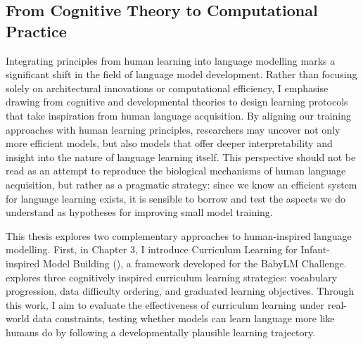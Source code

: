 

\subsection*{From Cognitive Theory to Computational Practice}

Integrating principles from human learning into language modelling marks a significant shift in the field of language model development. Rather than focusing solely on architectural innovations or computational efficiency, I emphasise drawing from cognitive and developmental theories to design learning protocols that take inspiration from human language acquisition. By aligning our training approaches with human learning principles, researchers may uncover not only more efficient models, but also models that offer deeper interpretability and insight into the nature of language learning itself. This perspective should not be read as an attempt to reproduce the biological mechanisms of human language acquisition, but rather as a pragmatic strategy: since we know an efficient system for language learning exists, it is sensible to borrow and test the aspects we do understand as hypotheses for improving small model training.

This thesis explores two complementary approaches to human-inspired language modelling. First, in Chapter 3, I introduce Curriculum Learning for Infant-inspired Model Building (\climb), a framework developed for the BabyLM Challenge. \climb explores three cognitively inspired curriculum learning strategies: vocabulary progression, data difficulty ordering, and graduated learning objectives. Through this work, I aim to evaluate the effectiveness of curriculum learning under real-world data constraints, testing whether models can learn language more like humans do by following a developmentally plausible learning trajectory.

